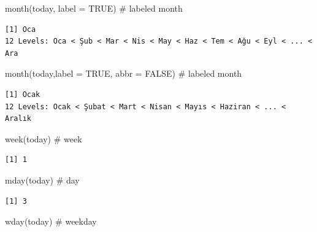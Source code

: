 \documentclass[
  letterpaper,
  DIV=11,
  numbers=noendperiod]{scrreprt}
\newenvironment{Shaded}{\begin{snugshade}}{\end{snugshade}}
\newcommand{\AttributeTok}[1]{\textcolor[rgb]{0.40,0.45,0.13}{#1}}
\newcommand{\CommentTok}[1]{\textcolor[rgb]{0.37,0.37,0.37}{#1}}
\newcommand{\ConstantTok}[1]{\textcolor[rgb]{0.56,0.35,0.01}{#1}}
\newcommand{\FunctionTok}[1]{\textcolor[rgb]{0.28,0.35,0.67}{#1}}
\newcommand{\NormalTok}[1]{\textcolor[rgb]{0.00,0.23,0.31}{#1}}
\begin{document}
\begin{Shaded}
\begin{Highlighting}[]
\FunctionTok{month}\NormalTok{(today, }\AttributeTok{label =} \ConstantTok{TRUE}\NormalTok{) }\CommentTok{\# labeled month}
\end{Highlighting}
\end{Shaded}

\begin{verbatim}
[1] Oca
12 Levels: Oca < Şub < Mar < Nis < May < Haz < Tem < Ağu < Eyl < ... < Ara
\end{verbatim}

\begin{Shaded}
\begin{Highlighting}[]
\FunctionTok{month}\NormalTok{(today,}\AttributeTok{label =} \ConstantTok{TRUE}\NormalTok{, }\AttributeTok{abbr =} \ConstantTok{FALSE}\NormalTok{) }\CommentTok{\# labeled month}
\end{Highlighting}
\end{Shaded}

\begin{verbatim}
[1] Ocak
12 Levels: Ocak < Şubat < Mart < Nisan < Mayıs < Haziran < ... < Aralık
\end{verbatim}

\begin{Shaded}
\begin{Highlighting}[]
\FunctionTok{week}\NormalTok{(today) }\CommentTok{\# week}
\end{Highlighting}
\end{Shaded}

\begin{verbatim}
[1] 1
\end{verbatim}

\begin{Shaded}
\begin{Highlighting}[]
\FunctionTok{mday}\NormalTok{(today) }\CommentTok{\# day}
\end{Highlighting}
\end{Shaded}

\begin{verbatim}
[1] 3
\end{verbatim}

\begin{Shaded}
\begin{Highlighting}[]
\FunctionTok{wday}\NormalTok{(today) }\CommentTok{\# weekday}
\end{Highlighting}
\end{Shaded}
\end{document}
